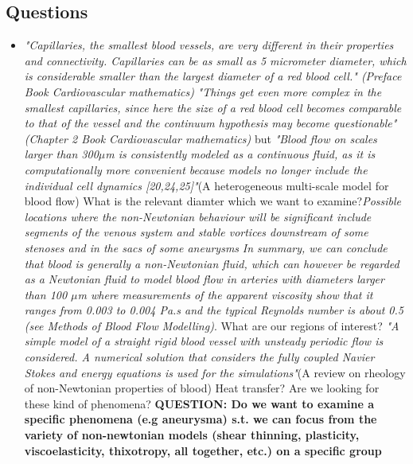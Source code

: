 \documentclass[11pt,letterpaper]{article}
\begin{document}
\subsection*{Questions}
\begin{itemize}
    \item  \textit{"Capillaries, the smallest blood vessels, are very different in their properties and connectivity. Capillaries can be as small as 5 micrometer diameter, which is considerable smaller than the largest diameter of a red blood cell." (Preface Book Cardiovascular mathematics)} \newline
    \textit{"Things get even more complex in the smallest capillaries, since here the size of a red blood cell becomes comparable to that of the vessel and the continuum hypothesis may become questionable" (Chapter 2 Book Cardiovascular mathematics)}\newline
    but \textit{"Blood flow on scales larger than 300$\mu$m is consistently modeled as a continuous fluid, as it is computationally more convenient because models no longer include the individual cell dynamics [20,24,25]"}(A heterogeneous multi-scale model for blood flow)
\newline
{\color{red}What is the relevant diamter which we want to examine?}\newline \textit{Possible locations where the non-Newtonian behaviour will be significant include segments of the venous system and stable vortices downstream of some stenoses and in the sacs of some aneurysms} \textit{In summary, we can conclude that blood is generally a non-Newtonian fluid, which can however be
regarded as a Newtonian fluid to model blood flow in arteries with diameters larger than 100 $\mu$m where measurements of the apparent viscosity show that it ranges from 0.003 to 0.004 Pa.s and the typical Reynolds number is about 0.5 (see Methods of Blood Flow Modelling)}.\newline
{\color{red} What are our regions of interest?} \newline \textit{"A simple model of a straight rigid blood vessel with unsteady periodic flow is considered. A numerical solution that considers the fully coupled Navier Stokes and energy equations is used for the simulations"}(A review on rheology of non-Newtonian properties of blood) \newline
{\color{red}Heat transfer?}
{\color{red} Are we looking for these kind of phenomena?} \newline\newline
{\color{red}\textbf{QUESTION: Do we want to examine a specific phenomena (e.g aneurysma) s.t. we can focus from the variety of non-newtonian models (shear thinning, plasticity, viscoelasticity, thixotropy, all together, etc.) on a specific group }   }


\end{itemize}
\end{document}
